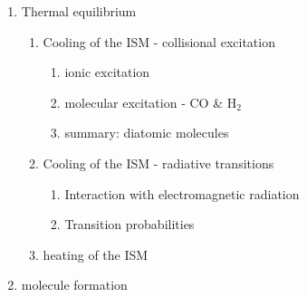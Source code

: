 \renewcommand\normalcolor{\color{yellow}}  %
\renewcommand\Black{\color{white}}        %
\color{white}                             %


\LogoOff
\bgclear


\vspace{-1cm}
\begin{enumerate}
 \item Thermal equilibrium \label{item:Teq}
 \begin{enumerate} 
  \item  Cooling of the  ISM - collisional excitation \label{item:Teq_cool}
  \begin{enumerate} 
    \item ionic excitation \label{item:Teq_cool_ion}
    \item molecular excitation - CO \& H$_2$ \label{item:Teq_cool_molecule}
    \item summary: diatomic molecules \label{item:Teq_cool_molstruct}
   \end{enumerate}
  \item Cooling of the  ISM - radiative transitions \label{item:Teq_cool_rad}
  \begin{enumerate}
    \item  Interaction with electromagnetic radiation \label{item:Teq_cool_rad_H}
    \item  Transition probabilities \label{item:Teq_cool_rad_prob}
\end{enumerate}
\item heating of the  ISM \label{item:Teq_heat}
\end{enumerate}
\item molecule formation \label{item:molec}

\end{enumerate}
